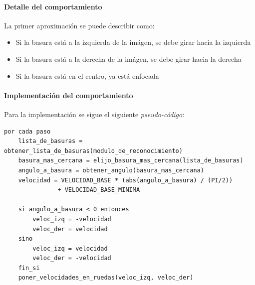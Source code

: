 \paragraph{Detalle del comportamiento}
La primer aproximaci\'on se puede describir como:
\begin{itemize}
\item Si la basura est\'a a la izquierda de la im\'agen, se debe girar hacia la
			izquierda
\item Si la basura est\'a a la derecha de la im\'agen, se debe girar hacia la
			derecha
\item Si la basura est\'a en el centro, ya est\'a enfocada
\end{itemize}

\paragraph{Implementaci\'on del comportamiento}
\label{focus_garbage:impl}
Para la implementaci\'on se sigue el siguiente \emph{pseudo-c\'odigo}:
\begin{verbatim}
por cada paso
    lista_de_basuras = obtener_lista_de_basuras(modulo_de_reconocimiento)
    basura_mas_cercana = elijo_basura_mas_cercana(lista_de_basuras)
    angulo_a_basura = obtener_angulo(basura_mas_cercana)
    velocidad = VELOCIDAD_BASE * (abs(angulo_a_basura) / (PI/2))
               + VELOCIDAD_BASE_MINIMA

    si angulo_a_basura < 0 entonces
        veloc_izq = -velocidad
        veloc_der = velocidad
    sino
        veloc_izq = velocidad
        veloc_der = -velocidad
    fin_si
    poner_velocidades_en_ruedas(veloc_izq, veloc_der)
\end{verbatim}


